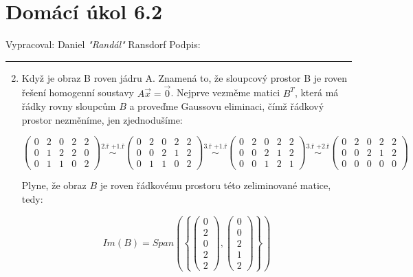 \documentclass[12pt]{article}
\begin{document}
\section*{Domácí úkol 6.2}

Vypracoval: Daniel \textit{"Randál"} Ransdorf \hfill Podpis: \rule{4cm}{0.4pt}

\begin{enumerate}
  \setcounter{enumi}{1}
  \item Když je obraz B roven jádru A. Znamená to, že sloupcový prostor B je roven
    řešení homogenní soustavy $A\vec{x} = \vec{0}$. Nejprve vezměme matici $B^T$,
    která má řádky rovny sloupcům $B$ a 
    proveďme Gaussovu eliminaci, čímž řádkový prostor nezměníme, jen zjednodušíme:

    \[
    \left(\begin{array}{ccccc}
      0&2&0&2&2 \\ 0&1&2&2&0 \\ 0&1&1&0&2
    \end{array}\right)
    \overset{\text{2.ř }+\text{1.ř}}{\sim}
    \left(\begin{array}{ccccc}
      0&2&0&2&2 \\ 0&0&2&1&2 \\ 0&1&1&0&2
    \end{array}\right)
    \overset{\text{3.ř }+\text{1.ř}}{\sim}
    \left(\begin{array}{ccccc}
      0&2&0&2&2 \\ 0&0&2&1&2 \\ 0&0&1&2&1
    \end{array}\right)
    \overset{\text{3.ř }+\text{2.ř}}{\sim}
    \left(\begin{array}{ccccc}
      0&2&0&2&2 \\ 0&0&2&1&2 \\ 0&0&0&0&0
    \end{array}\right)
    \]

    Plyne, že obraz $B$ je roven řádkovému prostoru této zeliminované matice, tedy:

    \[
      Im(B) = Span\left(\left\{
        \left(
          \begin{array}{c}
            0\\2\\0\\2\\2
          \end{array}
        \right),
        \left(
          \begin{array}{c}
            0\\0\\2\\1\\2
          \end{array}
        \right)
      \right\}\right)
    \]


\end{enumerate}
\end{document}
